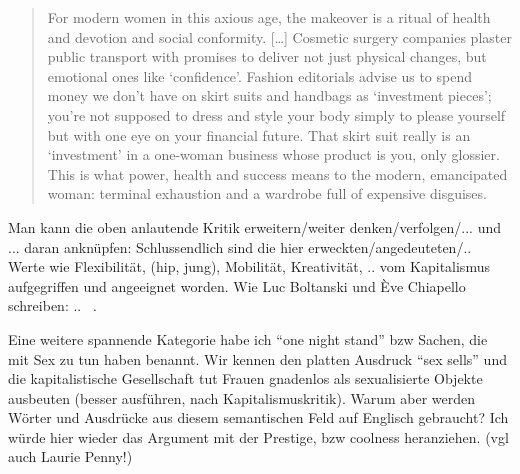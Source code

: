 \begin{quote}
For modern women in this axious age, the makeover is a ritual of health and devotion and social conformity.
[\ldots]
Cosmetic surgery companies plaster public transport with promises to deliver not just physical changes, but emotional ones like `confidence'.
Fashion editorials advise us to spend money we don't have on skirt suits and handbags as `investment pieces'; you're not supposed to dress and style your body simply to please yourself but with one eye on your financial future.
That skirt suit really is an `investment' in a one-woman business whose product is you, only glossier.
This is what power, health and success means to the modern, emancipated woman: terminal exhaustion and a wardrobe full of expensive disguises.~\cite[p.41-42]{Penny14}
\end{quote}


Man kann die oben anlautende Kritik erweitern/weiter denken/verfolgen/... und ... daran anknüpfen:
Schlussendlich sind die hier erweckten/angedeuteten/.. Werte wie Flexibilität, (hip, jung), Mobilität, Kreativität, .. vom Kapitalismus aufgegriffen und angeeignet worden.
Wie Luc Boltanski und Ève Chiapello schreiben: .. ~\cite[]{BolChi07}.

Eine weitere spannende Kategorie habe ich ``one night stand'' bzw Sachen, die mit Sex zu tun haben benannt.
Wir kennen den platten Ausdruck ``sex sells'' und die kapitalistische Gesellschaft tut Frauen gnadenlos als sexualisierte Objekte ausbeuten (besser ausführen, nach Kapitalismuskritik).
Warum aber werden Wörter und Ausdrücke aus diesem semantischen Feld auf Englisch gebraucht?
Ich würde hier wieder das Argument mit der Prestige, bzw coolness heranziehen. (vgl auch Laurie Penny!)


